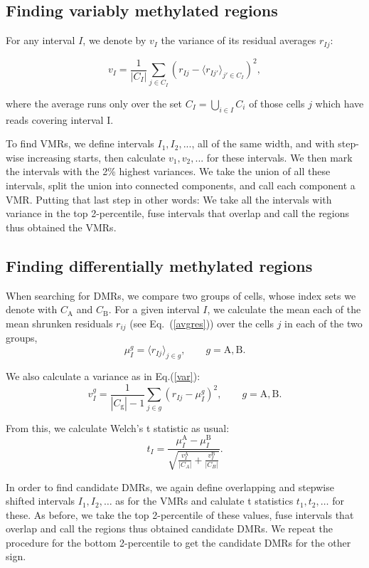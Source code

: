 \documentclass[twocolumn,10pt]{article}
\begin{document}
\subsection{Finding variably methylated regions}

For any interval $I$, we denote by $v_I$ the variance of its residual averages $r_{Ij}$:

\begin{equation} 
v_I = \frac{1}{|C_I|}\sum_{j\in C_I}\left( r_{Ij} - \langle r_{Ij'}\rangle_{j'\in C_I} \right)^2, \label{var}
\end{equation}

where the average runs only over the set $C_I=\bigcup_{i\in I}C_i$ of those cells $j$ which have reads covering interval I.

To find VMRs, we define intervals $I_1, I_2, ...$, all of the same width, and with step-wise increasing starts, then calculate $v_1, v_2, ...$ for these intervals.
We then mark the intervals with the 2\% highest variances.
We take the union of all these intervals, split the union into connected components, and call each component a VMR.
Putting that last step in other words:
We take all the intervals with variance in the top 2-percentile, fuse intervals that overlap and call the regions thus obtained the VMRs.

\subsection{Finding differentially methylated regions}

When searching for DMRs, we compare two groups of cells, whose index sets we denote with $C_\text{A}$ and $C_\text{B}$.
For a given interval $I$, we calculate the mean each of the mean shrunken residuals $r_{ij}$ (see Eq.~(\ref{avgres})) over the cells $j$ in each of the two groups,
\[ \mu^g_I = \langle r_{Ij} \rangle_{j\in g},\qquad g=\text{A},\text{B}. \]

We also calculate a variance as in Eq.(\ref{var}):
\[ v^g_I = \frac{1}{|C_\text{g}|-1}  \sum_{j\in g} \left( r_{Ij} - \mu_I^g \right)^2, 
\qquad g=\text{A},\text{B}.\]

From this, we calculate Welch's t statistic as usual:
\[ t_I = \frac{\mu^\text{A}_I - \mu^\text{B}_I}{\sqrt{\frac{v^\text{A}_I}{|C_A|} + \frac{v^\text{B}_I}{|C_B|}}}.\]

In order to find candidate DMRs, we again define overlapping and stepwise shifted intervals $I_1, I_2, \dots$ as for the VMRs and calulate t statistics $t_1, t_2, \dots$ for these.
As before, we take the top 2-percentile of these values, fuse intervals that overlap and call the regions thus obtained candidate DMRs.
We repeat the procedure for the bottom 2-percentile to get the candidate DMRs for the other sign.
\end{document}
